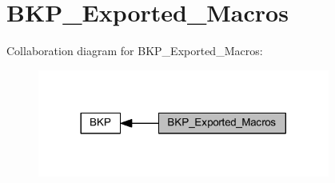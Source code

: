 \hypertarget{group___b_k_p___exported___macros}{}\section{B\+K\+P\+\_\+\+Exported\+\_\+\+Macros}
\label{group___b_k_p___exported___macros}
Collaboration diagram for B\+K\+P\+\_\+\+Exported\+\_\+\+Macros\+:
\nopagebreak
\begin{figure}[H]
\begin{center}
\leavevmode
\includegraphics[width=272pt]{group___b_k_p___exported___macros}
\end{center}
\end{figure}
